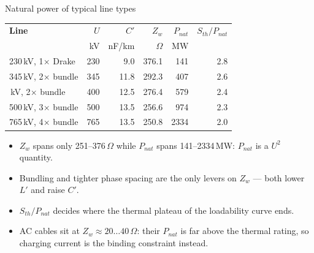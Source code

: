 \begin{frame}{Natural power of typical line types}
  \centering
  \renewcommand{\arraystretch}{1.25}
  \begin{tabular}{@{}l r r r r r@{}}
    \textbf{Line} & \textbf{$U$} & \textbf{$C'$} & \textbf{$Z_w$}
                  & \textbf{$P_{nat}$} & \textbf{$S_{th}/P_{nat}$} \\
                  & kV & nF/km & $\Omega$ & MW & \\
    \hline
    230\,kV, 1$\times$ Drake     & 230 &  9.0 & 376.1 &  141 & 2.8 \\
    345\,kV, 2$\times$ bundle    & 345 & 11.8 & 292.3 &  407 & 2.6 \\
    \atrowhighlight
    400\,kV, 2$\times$ bundle    & 400 & 12.5 & 276.4 &  579 & 2.4 \\
    500\,kV, 3$\times$ bundle    & 500 & 13.5 & 256.6 &  974 & 2.3 \\
    765\,kV, 4$\times$ bundle    & 765 & 13.5 & 250.8 & 2334 & 2.0 \\
    \hline
  \end{tabular}

  \vspace{0.6em}
  {\small
  \begin{itemize}
    \setlength{\itemsep}{0.2em}
    \item $Z_w$ spans only 251--376\,$\Omega$ while $P_{nat}$ spans
          141--2334\,MW: $P_{nat}$ is a $U^2$ quantity.
    \item Bundling and tighter phase spacing are the only levers on $Z_w$ ---
          both lower $L'$ and raise $C'$.
    \item $S_{th}/P_{nat}$ decides where the thermal plateau of the
          loadability curve ends.
    \item AC cables sit at $Z_w\approx20\ldots40\,\Omega$: their $P_{nat}$ is
          far above the thermal rating, so charging current is the binding
          constraint instead.
  \end{itemize}}
\end{frame}

